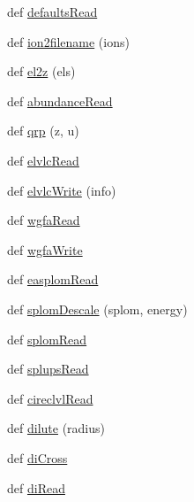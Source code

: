 \begin{DoxyCompactItemize}
\item 
def \hyperlink{namespacepyneb_1_1utils_1_1__chianti__tools_a235ada2c4e384f436dbade0913107585}{defaults\+Read}
\item 
def \hyperlink{namespacepyneb_1_1utils_1_1__chianti__tools_ad4bc7b577fd4c3819ceb00b0a444351b}{ion2filename} (ions)
\item 
def \hyperlink{namespacepyneb_1_1utils_1_1__chianti__tools_a32ffd2ba65d19385acc6921d77da7976}{el2z} (els)
\item 
def \hyperlink{namespacepyneb_1_1utils_1_1__chianti__tools_a25c22edea4645bdc590eed4a1c86fea8}{abundance\+Read}
\item 
def \hyperlink{namespacepyneb_1_1utils_1_1__chianti__tools_af9318412aecf0f6ac826b43796d594db}{qrp} (z, u)
\item 
def \hyperlink{namespacepyneb_1_1utils_1_1__chianti__tools_ac848d0b5ea14bf4adf6e8cd5d46fb639}{elvlc\+Read}
\item 
def \hyperlink{namespacepyneb_1_1utils_1_1__chianti__tools_a279f0911664046ffd65c19571be8a84d}{elvlc\+Write} (info)
\item 
def \hyperlink{namespacepyneb_1_1utils_1_1__chianti__tools_a3ef36a1d0a4df4cab94a392d2a3da980}{wgfa\+Read}
\item 
def \hyperlink{namespacepyneb_1_1utils_1_1__chianti__tools_a300c13ee6815450bc20d25a2c6dcb8a8}{wgfa\+Write}
\item 
def \hyperlink{namespacepyneb_1_1utils_1_1__chianti__tools_aa36b22e4e67bccdea3436dcc05e7ba5b}{easplom\+Read}
\item 
def \hyperlink{namespacepyneb_1_1utils_1_1__chianti__tools_a391eb09a09769234e5759d5544d0bcaf}{splom\+Descale} (splom, energy)
\item 
def \hyperlink{namespacepyneb_1_1utils_1_1__chianti__tools_a8013cd9bdbf2f8ec5a5ac06e25b0e3a4}{splom\+Read}
\item 
def \hyperlink{namespacepyneb_1_1utils_1_1__chianti__tools_a6e5e0d51ad5dd162d51353c6d2e49d3b}{splups\+Read}
\item 
def \hyperlink{namespacepyneb_1_1utils_1_1__chianti__tools_a0811a3ad9efb623a53fd1ebfd8c5c73f}{cireclvl\+Read}
\item 
def \hyperlink{namespacepyneb_1_1utils_1_1__chianti__tools_a5d55ad976e899b30719ac9b053e34ceb}{dilute} (radius)
\item 
def \hyperlink{namespacepyneb_1_1utils_1_1__chianti__tools_a1d4803c6e3b7cbb996b9da3f763ab6ee}{di\+Cross}
\item 
def \hyperlink{namespacepyneb_1_1utils_1_1__chianti__tools_a28552b5d18a1b604ed4512c435e648bc}{di\+Read}

\end{DoxyCompactItemize}
